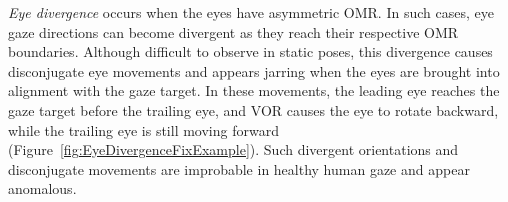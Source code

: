 \emph{Eye divergence} occurs when the eyes have asymmetric OMR. In such cases, eye gaze directions can become divergent as they reach their respective OMR boundaries. Although difficult to observe in static poses, this divergence causes disconjugate eye movements and appears jarring when the eyes are brought into alignment with the gaze target. In these movements, the leading eye reaches the gaze target before the trailing eye, and VOR causes the eye to rotate backward, while the trailing eye is still moving forward (Figure~\ref{fig:EyeDivergenceFixExample}). Such divergent orientations and disconjugate movements are improbable in healthy human gaze and appear anomalous. 